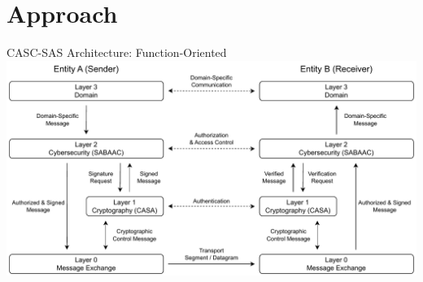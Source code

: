\documentclass[en]{sdqbeamer}
\begin{document}
\section{Approach}
\begin{frame}{CASC-SAS Architecture: Function-Oriented}
    \centering
    \includegraphics[height=0.75\textheight]{./figures/layers_request_example.drawio.pdf}
\end{frame}
\end{document}
